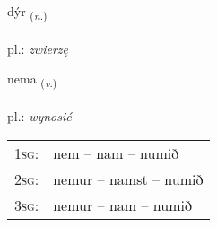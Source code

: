 \documentclass[frontgrid, backgrid]{flacards}\usepackage[]{graphicx}\usepackage[]{xcolor}
\begin{document}
\renewcommand{\flhead}{\vskip5pt \fboxsep=0pt {\small\bfseries\footnotesize Nafnorð | rzeczownik}}
\renewcommand{\fcfoot}{\vskip5pt \fboxsep=0pt \hspace{2pt}{\small\bfseries\footnotesize 1K}}

\renewcommand{\blhead}{\vskip5pt {\small\bfseries\footnotesize Nafnorð | rzeczownik }}
\renewcommand{\bcfoot}{\vskip5pt \hspace{2pt}{\small\bfseries\footnotesize 1K}}


{dýr \small{\textsubscript{(\textit{n.})}} \\[1ex] %
\textphonetic{[tiːr]} \\
pl.: \emph{zwierzę} \\  [2ex]
\renewcommand*{\arraystretch}{0.8}
}

\renewcommand{\flhead}{\vskip5pt \fboxsep=0pt {\small\bfseries\footnotesize Sagnorð | czasownik}}
\renewcommand{\fcfoot}{\vskip5pt \fboxsep=0pt \hspace{2pt}{\small\bfseries\footnotesize 1K}}

\renewcommand{\blhead}{\vskip5pt {\small\bfseries\footnotesize Sagnorð | czasownik }}
\renewcommand{\bcfoot}{\vskip5pt \hspace{2pt}{\small\bfseries\footnotesize 1K}}


{nema \small{\textsubscript{(\textit{v.})}} \\[1ex] %
\textphonetic{[nɛːma]} \\
pl.: \emph{wynosić} \\  [2ex]
\renewcommand*{\arraystretch}{0.8}
\begin{tabular}{p{1cm}l}
\textsc{1sg}: & nem -- nam -- numið \\ 
\textsc{2sg}: & nemur -- namst -- numið \\ 
\textsc{3sg}: & nemur -- nam -- numið \\ 
\end{tabular}
}
\end{document}
